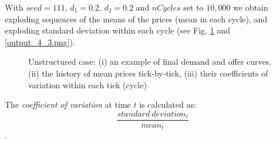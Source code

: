 \documentclass[10pt]{report}
\begin{document}
With $seed=111$, $d_1=0.2$, $d_2=0.2$ and $nCycles$ set to $10,000$ we obtain exploding sequences of the means of the prices (mean in each cycle), and exploding standard deviation within each cycle (see Fig. \ref{output_4_2.png} and \ref{output_4_3.png}).

\begin{figure}[H]
\begin{center}
\caption{Unstructured case: (i) an example of final demand and offer curves, (ii) the history of mean prices tick-by-tick, (iii) their coefficients of variation within each tick (cycle)}
\label{output_4_2.png}
\end{center}
\end{figure}

The \emph{coefficient of variation} at time $t$ is calculated as: $$\frac{standard~deviation_t}{mean_t}$$.
\end{document}
